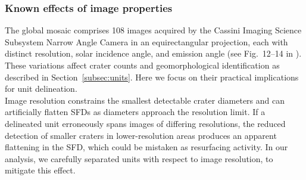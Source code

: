 \documentclass[preprint,11pt,3p,times,authoryear]{elsarticle}
\begin{document}
\subsubsection{Known effects of image properties}
\setcounter{section}{5}
\setcounter{subsection}{1}
\setcounter{subsubsection}{1}
\label{subsec:instrumental}
The global mosaic comprises 108 images acquired by the Cassini Imaging Science Subsystem Narrow Angle Camera \citep[ISS/NAC;][]{Porco2004} in an equirectangular projection, each with distinct resolution, solar incidence angle, and emission angle (see Fig.~12–14 in \citet{Bland2018}). These variations affect crater counts and geomorphological identification as described in Section~\ref{subsec:units}. Here we focus on their practical implications for unit delineation.\\
Image resolution constrains the smallest detectable crater diameters and can artificially flatten SFDs as diameters approach the resolution limit. If a delineated unit erroneously spans images of differing resolutions, the reduced detection of smaller craters in lower-resolution areas produces an apparent flattening in the SFD, which could be mistaken as resurfacing activity. In our analysis, we carefully separated units with respect to image resolution, to mitigate this effect.\\
\end{document}
